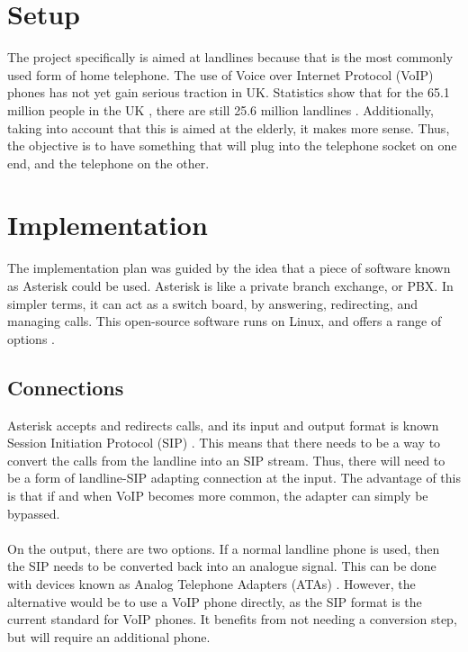 \documentclass[12pt,a4paper]{report}
\begin{document}
\section{Setup}
The project specifically is aimed at landlines because that is the most commonly used form of home telephone. The use of Voice over Internet Protocol (VoIP) phones has not yet gain serious traction in UK. Statistics show that for the 65.1 million people in the UK \cite{ons-population}, there are still 25.6 million landlines \cite{ofcom}. Additionally, taking into account that this is aimed at the elderly, it makes more sense. Thus, the objective is to have something that will plug into the telephone socket on one end, and the telephone on the other.

\section{Implementation}
The implementation plan was guided by the idea that a piece of software known as Asterisk could be used. Asterisk is like a private branch exchange, or PBX. In simpler terms, it can act as a switch board, by answering, redirecting, and managing calls. This open-source software runs on Linux, and offers a range of options \cite{asterisk}.

\subsection{Connections}
Asterisk accepts and redirects calls, and its input and output format is known Session Initiation Protocol (SIP) \cite{sip}. This means that there needs to be a way to convert the calls from the landline into an SIP stream. Thus, there will need to be a form of landline-SIP adapting connection at the input. The advantage of this is that if and when VoIP becomes more common, the adapter can simply be bypassed.
\\\\
On the output, there are two options. If a normal landline phone is used, then the SIP needs to be converted back into an analogue signal. This can be done with devices known as Analog Telephone Adapters (ATAs) \cite{ata}. However, the alternative would be to use a VoIP phone directly, as the SIP format is the current standard for VoIP phones. It benefits from not needing a conversion step, but will require an additional phone.
\end{document}
